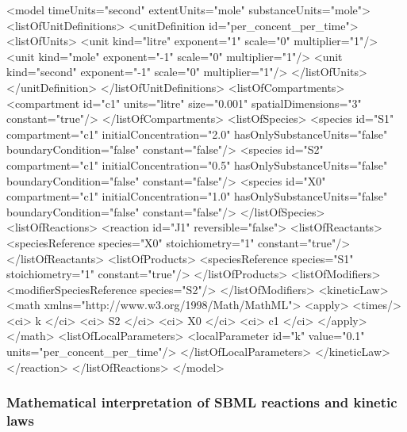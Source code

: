 \begin{example}
<model timeUnits="second" extentUnits="mole" substanceUnits="mole">
    <listOfUnitDefinitions>
        <unitDefinition id="per_concent_per_time">
            <listOfUnits>
                <unit kind="litre"  exponent="1"  scale="0" multiplier="1"/>
                <unit kind="mole"   exponent="-1" scale="0" multiplier="1"/>
                <unit kind="second" exponent="-1" scale="0" multiplier="1"/>
            </listOfUnits>
        </unitDefinition>
    </listOfUnitDefinitions>
    <listOfCompartments>
        <compartment id="c1" units="litre" size="0.001" spatialDimensions="3" constant="true"/>
    </listOfCompartments>
    <listOfSpecies>
        <species id="S1" compartment="c1" initialConcentration="2.0" 
                 hasOnlySubstanceUnits="false" boundaryCondition="false" constant="false"/>
        <species id="S2" compartment="c1" initialConcentration="0.5" 
                 hasOnlySubstanceUnits="false" boundaryCondition="false" constant="false"/>
        <species id="X0" compartment="c1" initialConcentration="1.0" 
                 hasOnlySubstanceUnits="false" boundaryCondition="false" constant="false"/>
    </listOfSpecies>
    <listOfReactions>
        <reaction id="J1" reversible="false">
            <listOfReactants>
                <speciesReference species="X0" stoichiometry="1" constant="true"/>
            </listOfReactants>
            <listOfProducts>
                <speciesReference species="S1" stoichiometry="1" constant="true"/>
            </listOfProducts>
            <listOfModifiers>
                <modifierSpeciesReference species="S2"/>
            </listOfModifiers>
            <kineticLaw>
                <math xmlns="http://www.w3.org/1998/Math/MathML">
                    <apply>
                        <times/> <ci> k </ci> <ci> S2 </ci> <ci> X0 </ci> <ci> c1 </ci>
                    </apply>
                </math>
                <listOfLocalParameters>
                    <localParameter id="k" value="0.1" units="per_concent_per_time"/>
                </listOfLocalParameters>
            </kineticLaw>
        </reaction>
    </listOfReactions>
</model>
\end{example}


\subsubsection{Mathematical interpretation of SBML reactions and kinetic laws}
\label{sec:about-kinetic-laws}

